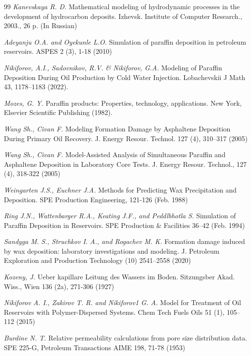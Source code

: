 \documentclass[12pt,twoside,a4paper]{uz_ku}
\begin{document}
\begin{thebibliography}{99}
\textit {Kanevskaya R. D.} Mathematical modeling of hydrodynamic processes in the development of hydrocarbon deposits. Izhevsk. Institute of Computer Research., 2003., 26 p. (In Russian)

\textit {Adeyanju O.A. and Oyekunle L.O.} Simulation of paraffin deposition in petroleum reservoirs. ASPES 2 (3), 1-18 (2010) 

\textit {Nikiforov, A.I., Sadovnikov, R.V. \& Nikiforov, G.A.} Modeling of Paraffin Deposition During Oil Production by Cold Water Injection. Lobachevskii J Math 43, 1178–1183 (2022). 

\textit {Mozes, G. Y.} Paraffin products: Properties, technology, applications. New York, Elsevier Scientific Publishing (1982).

\textit {Wang Sh., Civan F.} Modeling Formation Damage by Asphaltene Deposition During Primary Oil Recovery. J. Energy Resour. Technol. 127 (4), 310–317 (2005) 

\textit {Wang Sh., Civan F.} Model-Assisted Analysis of Simultaneous Paraffin and Asphaltene Deposition in Laboratory Core Tests. J. Energy Resour. Technol., 127 (4), 318-322 (2005) 

\textit {Weingarten J.S., Euchner J.A.} Methods for Predicting Wax Precipitation and Deposition. SPE Production Engineering, 121-126 (Feb. 1988) 

\textit {Ring J.N., Wattenbarger R.A., Keating J.F., and Peddlbhotla S.} Simulation of Paraffin Deposition in Reservoirs. SPE Production \& Facilities 36–42 (Feb. 1994) 

\textit {Sandyga M. S., Struchkov I. A., and Rogachev M. K.} Formation damage induced by wax deposition: laboratory investigations and modeling. J. Petroleum Exploration and Production Technology (10) 2541–2558 (2020)

\textit {Kozeny, J.} Ueber kapillare Leitung des Wassers im Boden. Sitzungsber Akad. Wiss., Wien 136 (2a), 271-306 (1927)

\textit {Nikiforov A. I., Zakirov T. R. and Nikiforov1 G. A.} Model for Treatment of Oil Reservoirs with Polymer-Dispersed Systems. Chem Tech Fuels Oils 51 (1), 105–112 (2015) 

\textit {Burdine N. T.} Relative permeability calculations from pore size distribution data. SPE 225-G, Petroleum Transactions AIME 198, 71-78 (1953) 


\end{thebibliography}
\end{document}
